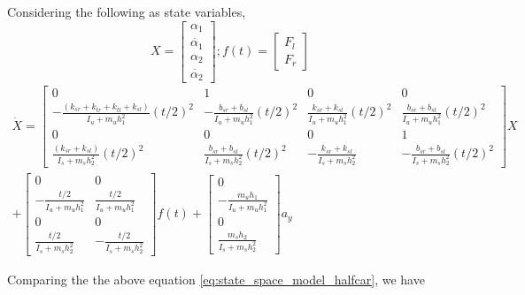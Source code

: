 \documentclass[12pt, a4paper, oneside]{report}
\begin{document}
Considering the following as state variables,
\begin{equation}
    X = \begin{bmatrix}
        \alpha_1 \\
        \dot{\alpha_1} \\
        \alpha_2 \\
        \dot{\alpha_2}
    \end{bmatrix} ; 
    f(t) = \begin{bmatrix}
        F_l \\
        F_r
    \end{bmatrix}
\end{equation}
\begin{multline}
    \dot{X} = \begin{bmatrix}
        0 & 1 & 0 & 0 \\
        -\frac{(k_{sr} + k_{tr} + k_{tl} +k_{sl})}{I_u + m_u h_1^2}(t/2)^2 & -\frac{b_{sr}+b_{sl}}{I_u + m_u h_1^2}(t/2)^2 & \frac{k_{sr} + k_{sl}}{I_u + m_u h_1^2}(t/2)^2 & \frac{b_{sr}+b_{sl}}{I_u + m_u h_1^2}(t/2)^2 \\
        0 & 0 & 0 & 1 \\
        \frac{(k_{sr} + k_{sl})}{I_s + m_s h_2^2}(t/2)^2 & \frac{b_{sr}+b_{sl}}{I_s + m_s h_2^2}(t/2)^2 & -\frac{k_{sr} + k_{sl}}{I_s + m_s h_2^2} & -\frac{b_{sr}+b_{sl}}{I_s + m_s h_2^2}(t/2)^2
    \end{bmatrix} X \\
    + \begin{bmatrix}
        0 & 0 \\
        -\frac{t/2}{I_u + m_u h_1^2} & \frac{t/2}{I_u + m_u h_1^2} \\
        0 & 0 \\
        \frac{t/2}{I_s + m_s h_2^2} & -\frac{t/2}{I_s + m_s h_2^2}
    \end{bmatrix} f(t) 
    + \begin{bmatrix}
        0 \\
        -\frac{m_u h_1}{I_u + m_u h_1^2} \\
        0 \\
        \frac{m_s h_2}{I_s + m_s h_2^2}
    \end{bmatrix} a_y
    \label{eq:state_space_model_halfcar}
\end{multline}

Comparing the the above equation \ref{eq:state_space_model_halfcar}, we have
\end{document}
